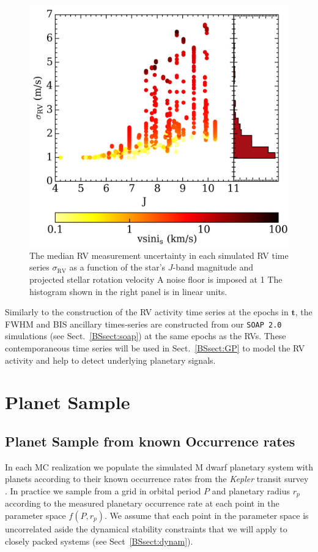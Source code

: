 \begin{figure}
  \centering
  \includegraphics[width=0.6\hsize]{figures/sigmaRV.png}%
  \caption[RV measurement uncertainty versus $J$-band magnitude and ]
      {\small The median RV measurement uncertainty in each simulated RV time series $\sigma_{\text{RV}}$
    as a function of the star's $J$-band magnitude and projected stellar rotation velocity  A noise floor is
    imposed at 1  The histogram shown in the right panel is in linear units.}
  \label{BSfig:sigmaRV}
\end{figure}

Similarly to the construction of the RV activity time series at the epochs in $\mathbf{t}$, the FWHM and BIS
ancillary times-series are constructed from our \texttt{SOAP 2.0} simulations (see Sect.~\ref{BSsect:soap}) 
at the same epochs as the RVs. These contemporaneous time series will be used in Sect.~\ref{BSsect:GP} to
model the RV activity and help to detect underlying planetary signals.


\section{Planet Sample} \label{BSsect:planetsample}
\subsection{Planet Sample from known Occurrence rates}
In each MC realization we populate the simulated M dwarf planetary system with planets according to
their known occurrence rates from the \emph{Kepler} transit survey \citep{dressing15a}. In practice
we sample from a grid in orbital period $P$ and planetary radius $r_p$
according to the measured planetary occurrence rate at each point in the parameter space $f(P,r_p)$.
We assume that each point in the parameter space is
uncorrelated aside the dynamical stability constraints that we will apply to closely packed systems 
(see Sect~\ref{BSsect:dynam}). \\

